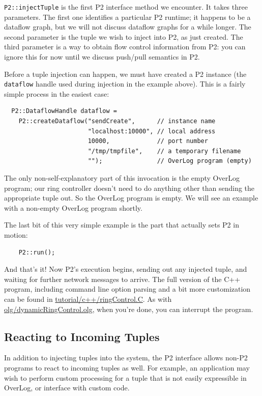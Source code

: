 \documentclass{article}
\begin{document}
\texttt{P2::injectTuple} is
the first P2 interface method we encounter. It takes three
parameters. The first one identifies a particular P2 runtime; it happens
to be a dataflow graph, but we will not discuss dataflow graphs for a
while longer.  The second parameter is the tuple we wish to inject into
P2, as just created. The third parameter is a way to obtain flow control
information from P2: you can ignore this for now until we discuss
push/pull semantics in P2.

Before a tuple injection can happen, we must have created a P2 instance
(the \texttt{dataflow} handle used during injection in the example
above). This is a fairly simple process in the easiest case:
\begin{verbatim}
  P2::DataflowHandle dataflow =
    P2::createDataflow("sendCreate",      // instance name
                       "localhost:10000", // local address
                       10000,             // port number
                       "/tmp/tmpfile",    // a temporary filename
                       "");               // OverLog program (empty)
\end{verbatim}
The only non-self-explanatory part of this invocation is the empty
OverLog program; our ring controller doesn't need to do anything other
than sending the appropriate tuple out. So the OverLog program is
empty. We will see an example with a non-empty OverLog program shortly.

The last bit of this very simple example is the part that actually sets
P2 in motion:
\begin{verbatim}
    P2::run();
\end{verbatim}
And that's it! Now P2's execution begins, sending out any injected
tuple, and waiting for further network messages to arrive. The full
version of the C++ program, including command line option parsing and a
bit more customization can be found in \url{tutorial/c++/ringControl.C}. As with
\url{olg/dynamicRingControl.olg}, when you're done, you can interrupt
the program.


\subsection{Reacting to Incoming Tuples}

In addition to injecting tuples into the system, the P2 interface allows
non-P2 programs to react to incoming tuples as well. For example, an
application may wish to perform custom processing for a tuple that is
not easily expressible in OverLog, or interface with custom code.
\end{document}
